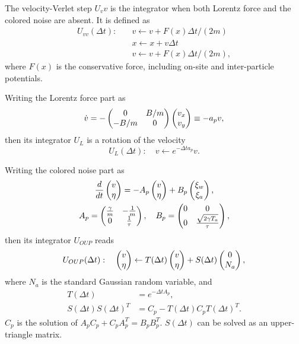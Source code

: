 \documentclass[
 amsmath,amssymb,
 aps,
 pre,
 longbibliography,
 10pt, onecolumn,
 notitlepage
]{revtex4-1}
\begin{document}
The velocity-Verlet step $U_vv$ is the integrator when both Lorentz force and the colored noise are absent. It is defined as
\begin{align}
U_{vv}(\Delta t):\quad
&v \leftarrow v + F(x) \Delta t / (2m) \\
&x \leftarrow x + v \Delta t \\
&v \leftarrow v + F(x) \Delta t / (2m),
\end{align}
where $F(x)$ is the conservative force, including on-site and inter-particle potentials.

Writing the Lorentz force part as
\begin{equation}
\dot{v} = -\pmqty{ 0 & B/m \\ -B/m & 0 } \pmqty{ v_x \\ v_y }
\equiv -a_p v ,
\end{equation}
then its integrator $U_L$ is a rotation of the velocity
\begin{equation}
    U_{L}(\Delta t):\quad
    v \leftarrow e^{-\Delta t a_p} v .
\end{equation}

Writing the colored noise part as
\begin{gather}
    \frac{d}{dt} \pmqty{ v \\ \eta }
    = -A_p \pmqty{ v \\ \eta } + B_p \pmqty{ \xi_w \\ \xi_a }, \\
    A_p = \pmqty{ \frac{\gamma}{m} & -\frac{1}{m} \\ 0 & \frac{1}{\tau} },\quad
    B_p = \pmqty{ 0 & 0 \\ 0 & \frac{\sqrt{2\gamma T_a}}{\tau} },
\end{gather}
then its integrator $U_{OUP}$ reads
\begin{equation}
    U_{OUP}(\Delta t):\quad
    \pmqty{ v \\ \eta } \leftarrow T(\Delta t) \pmqty{ v \\ \eta } + S(\Delta t) \pmqty{ 0 \\ N_a },
\end{equation}
where $N_a$ is the standard Gaussian random variable, and
\begin{align}
T(\Delta t) &= e^{-\Delta t A_p} ,\\
S(\Delta t)S(\Delta t)^T &= C_p - T(\Delta t) C_p T(\Delta t) ^T .
\end{align}
$C_p$ is the solution of $A_p C_p + C_p A_p^T = B_pB_p^T$.
$S(\Delta t)$ can be solved as an upper-triangle matrix.
\end{document}
